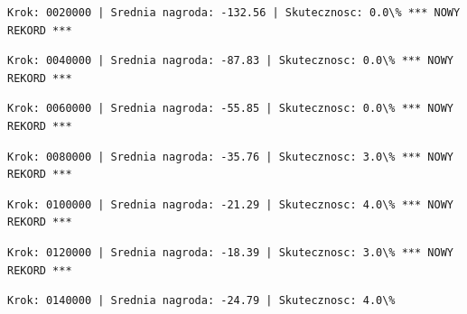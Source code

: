 \documentclass[11pt]{article}
\begin{document}
    
    
    \begin{Verbatim}[commandchars=\\\{\}]
Krok: 0020000 | Srednia nagroda: -132.56 | Skutecznosc: 0.0\% *** NOWY REKORD ***

    \end{Verbatim}

    
    
    \begin{Verbatim}[commandchars=\\\{\}]
Krok: 0040000 | Srednia nagroda: -87.83 | Skutecznosc: 0.0\% *** NOWY REKORD ***

    \end{Verbatim}

    
    
    \begin{Verbatim}[commandchars=\\\{\}]
Krok: 0060000 | Srednia nagroda: -55.85 | Skutecznosc: 0.0\% *** NOWY REKORD ***

    \end{Verbatim}

    
    
    \begin{Verbatim}[commandchars=\\\{\}]
Krok: 0080000 | Srednia nagroda: -35.76 | Skutecznosc: 3.0\% *** NOWY REKORD ***

    \end{Verbatim}

    
    
    \begin{Verbatim}[commandchars=\\\{\}]
Krok: 0100000 | Srednia nagroda: -21.29 | Skutecznosc: 4.0\% *** NOWY REKORD ***

    \end{Verbatim}

    
    
    \begin{Verbatim}[commandchars=\\\{\}]
Krok: 0120000 | Srednia nagroda: -18.39 | Skutecznosc: 3.0\% *** NOWY REKORD ***

    \end{Verbatim}

    
    
    \begin{Verbatim}[commandchars=\\\{\}]
Krok: 0140000 | Srednia nagroda: -24.79 | Skutecznosc: 4.0\%

    \end{Verbatim}
\end{document}
